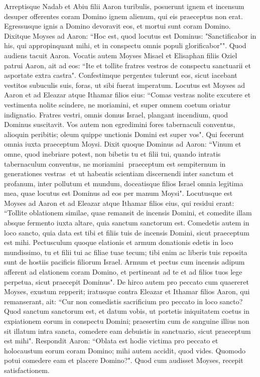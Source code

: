 \begin{biblechapter}  
\verse Arreptisque Nadab et Abiu filii Aaron turibulis, posuerunt ignem et incensum desuper offerentes coram Domino ignem alienum, qui eis praeceptus non erat. 
\verse Egressusque ignis a Domino devoravit eos, et mortui sunt coram Domino. 
\verse Dixitque Moyses ad Aaron: “Hoc est, quod locutus est Dominus: "Sanctificabor in his, qui appropinquant mihi, et in conspectu omnis populi glorificabor"". Quod audiens tacuit Aaron. 
\verse Vocatis autem Moyses Misael et Elisaphan filiis Oziel patrui Aaron, ait ad eos: “Ite et tollite fratres vestros de conspectu sanctuarii et asportate extra castra". 
\verse Confestimque pergentes tulerunt eos, sicut iacebant vestitos subuculis suis, foras, ut sibi fuerat imperatum. 
\verse Locutus est Moyses ad Aaron et ad Eleazar atque Ithamar filios eius: “Comas vestras nolite excutere et vestimenta nolite scindere, ne moriamini, et super omnem coetum oriatur indignatio. Fratres vestri, omnis domus Israel, plangant incendium, quod Dominus suscitavit. 
\verse Vos autem non egredimini fores tabernaculi conventus, alioquin peribitis; oleum quippe unctionis Domini est super vos". Qui fecerunt omnia iuxta praeceptum Moysi. 
\verse Dixit quoque Dominus ad Aaron: 
\verse “Vinum et omne, quod inebriare potest, non bibetis tu et filii tui, quando intratis tabernaculum conventus, ne moriamini ­ praeceptum est sempiternum in generationes vestras ­
\verse et ut habeatis scientiam discernendi inter sanctum et profanum, inter pollutum et mundum, 
\verse doceatisque filios Israel omnia legitima mea, quae locutus est Dominus ad eos per manum Moysi". 
\verse Locutusque est Moyses ad Aaron et ad Eleazar atque Ithamar filios eius, qui residui erant: “Tollite oblationem similae, quae remansit de incensis Domini, et comedite illam absque fermento iuxta altare, quia sanctum sanctorum est.  
\verse Comedetis autem in loco sancto, quia data est tibi et filiis tuis de incensis Domini, sicut praeceptum est mihi. 
\verse Pectusculum quoque elationis et armum donationis edetis in loco mundissimo, tu et filii tui ac filiae tuae tecum; tibi enim ac liberis tuis reposita sunt de hostiis pacificis filiorum Israel. 
\verse Armum et pectus cum incensis adipum afferent ad elationem coram Domino, et pertineant ad te et ad filios tuos lege perpetua, sicut praecepit Dominus". 
\verse De hirco autem pro peccato cum quaereret Moyses, exustum repperit; iratusque contra Eleazar et Ithamar filios Aaron, qui remanserant, ait: 
\verse “Cur non comedistis sacrificium pro peccato in loco sancto? Quod sanctum sanctorum est, et datum vobis, ut portetis iniquitatem coetus in expiationem eorum in conspectu Domini; 
\verse praesertim cum de sanguine illius non sit illatum intra sancta, comedere eam debuistis in sanctuario, sicut praeceptum est mihi". 
\verse Respondit Aaron: “Oblata est hodie victima pro peccato et holocaustum eorum coram Domino; mihi autem accidit, quod vides. Quomodo potui comedere eam et placere Domino?". 
\verse Quod cum audisset Moyses, recepit satisfactionem. 
\end{biblechapter}

